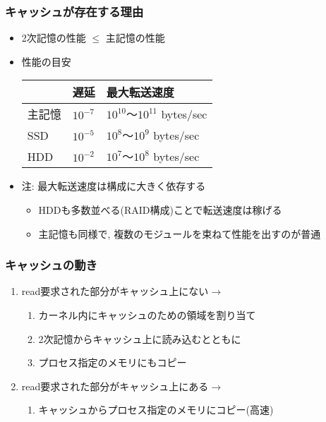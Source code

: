 \documentclass[12pt,dvipdfmx]{beamer}
\begin{document}
\begin{frame}
  \frametitle{キャッシュが存在する理由}
  \begin{itemize}
  \item 2次記憶の性能 $\leq$ 主記憶の性能
  \item 性能の目安

    \begin{tabular}{|l|l|l|}\hline
             & 遅延     & 最大転送速度    \\\hline
      主記憶 & $10^{-7}$ & $10^{10}$〜$10^{11}$ bytes/sec \\
      SSD    & $10^{-5}$ & $10^{8}$〜$10^{9}$ bytes/sec \\
      HDD    & $10^{-2}$ & $10^{7}$〜$10^{8}$ bytes/sec \\\hline
    \end{tabular}
  \item 注: 最大転送速度は構成に大きく依存する
    \begin{itemize}
    \item HDDも多数並べる(RAID構成)ことで転送速度は稼げる
    \item 主記憶も同様で, 複数のモジュールを束ねて性能を出すのが普通
    \end{itemize}
  \end{itemize}
\end{frame}

\begin{frame}
  \frametitle{キャッシュの動き}
  \begin{enumerate}
  \item <2-> read要求された部分がキャッシュ上にない$\rightarrow$
    \begin{enumerate}
    \item <3-> カーネル内にキャッシュのための領域を割り当て
    \item <4-> 2次記憶からキャッシュ上に読み込むとともに
    \item <5-> プロセス指定のメモリにもコピー
    \end{enumerate}
  \item <6-> read要求された部分がキャッシュ上にある$\rightarrow$
    \begin{enumerate}
    \item <7-> キャッシュからプロセス指定のメモリにコピー(高速)
    \end{enumerate}
  \end{enumerate}
  
  \begin{center}
  \end{center}
\end{frame}
\end{document}
